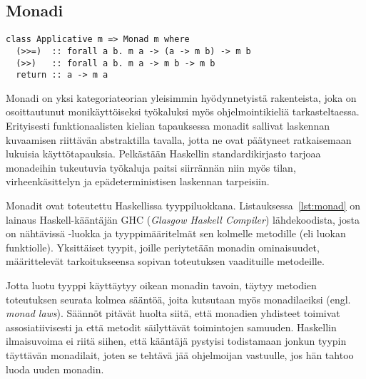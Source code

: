 \documentclass[finnish]{tktltiki2}
\begin{document}



\subsection{Monadi}

\begin{lstlisting}[float,float,label={lst:monad},caption={Monad-tyyppiluokka}]
class Applicative m => Monad m where
  (>>=)  :: forall a b. m a -> (a -> m b) -> m b
  (>>)   :: forall a b. m a -> m b -> m b
  return :: a -> m a
\end{lstlisting}

Monadi on yksi kategoriateorian yleisimmin hyödynnetyistä rakenteista, joka on osoittautunut
monikäyttöiseksi työkaluksi myös ohjelmointikieliä tarkasteltaessa. Erityisesti funktionaalisten
kielian tapauksessa monadit sallivat laskennan kuvaamisen riittävän abstraktilla tavalla, jotta ne
ovat päätyneet ratkaisemaan lukuisia käyttötapauksia. Pelkästään Haskellin standardikirjasto tarjoaa
monadeihin tukeutuvia työkaluja paitsi siirrännän niin myös tilan, virheenkäsittelyn ja
epädeterministisen laskennan tarpeisiin.

Monadit ovat toteutettu Haskellissa tyyppiluokkana. Listauksessa~\ref{lst:monad} on lainaus
Haskell-kääntäjän GHC (\emph{Glasgow Haskell Compiler}) lähdekoodista, josta on nähtävissä
-luokka ja tyyppimääritelmät sen kolmelle metodille (eli luokan funktiolle). Yksittäiset
tyypit, joille periytetään monadin ominaisuudet, määrittelevät tarkoitukseensa sopivan toteutuksen
vaadituille metodeille.

Jotta luotu tyyppi käyttäytyy oikean monadin tavoin, täytyy metodien toteutuksen seurata kolmea
sääntöä, joita kutsutaan myös monadilaeiksi (engl. \emph{monad laws}). Säännöt pitävät huolta siitä,
että monadien yhdisteet toimivat assosiatiivisesti ja että metodit säilyttävät toimintojen samuuden.
Haskellin ilmaisuvoima ei riitä siihen, että kääntäjä pystyisi todistamaan jonkun tyypin täyttävän
monadilait, joten se tehtävä jää ohjelmoijan vastuulle, jos hän tahtoo luoda uuden monadin.
\end{document}
